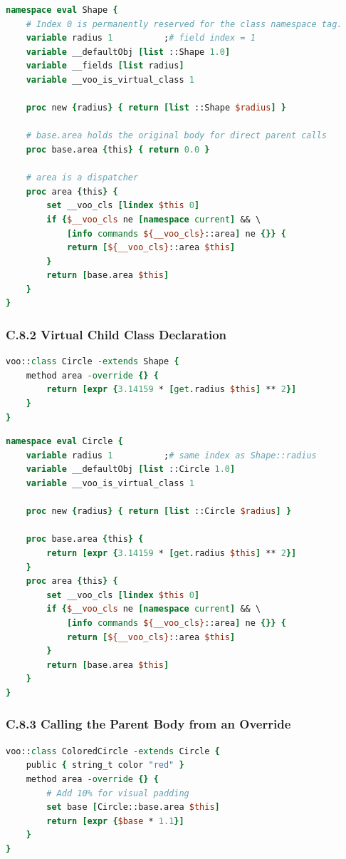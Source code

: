 \begin{lstlisting}[language=Tcl, caption={Raw Vanilla Tcl generated for virtual base}]
namespace eval Shape {
    # Index 0 is permanently reserved for the class namespace tag.
    variable radius 1          ;# field index = 1
    variable __defaultObj [list ::Shape 1.0]
    variable __fields [list radius]
    variable __voo_is_virtual_class 1

    proc new {radius} { return [list ::Shape $radius] }

    # base.area holds the original body for direct parent calls
    proc base.area {this} { return 0.0 }

    # area is a dispatcher
    proc area {this} {
        set __voo_cls [lindex $this 0]
        if {$__voo_cls ne [namespace current] && \
            [info commands ${__voo_cls}::area] ne {}} {
            return [${__voo_cls}::area $this]
        }
        return [base.area $this]
    }
}
\end{lstlisting}

\subsubsection*{C.8.2 Virtual Child Class Declaration}
\begin{lstlisting}[language=Tcl, caption={Child class overriding a virtual method}]
voo::class Circle -extends Shape {
    method area -override {} {
        return [expr {3.14159 * [get.radius $this] ** 2}]
    }
}
\end{lstlisting}

\begin{lstlisting}[language=Tcl, caption={Raw Vanilla Tcl generated for child class}]
namespace eval Circle {
    variable radius 1          ;# same index as Shape::radius
    variable __defaultObj [list ::Circle 1.0]
    variable __voo_is_virtual_class 1

    proc new {radius} { return [list ::Circle $radius] }

    proc base.area {this} {
        return [expr {3.14159 * [get.radius $this] ** 2}]
    }
    proc area {this} {
        set __voo_cls [lindex $this 0]
        if {$__voo_cls ne [namespace current] && \
            [info commands ${__voo_cls}::area] ne {}} {
            return [${__voo_cls}::area $this]
        }
        return [base.area $this]
    }
}
\end{lstlisting}

\subsubsection*{C.8.3 Calling the Parent Body from an Override}
\begin{lstlisting}[language=Tcl]
voo::class ColoredCircle -extends Circle {
    public { string_t color "red" }
    method area -override {} {
        # Add 10% for visual padding
        set base [Circle::base.area $this]
        return [expr {$base * 1.1}]
    }
}
\end{lstlisting}

